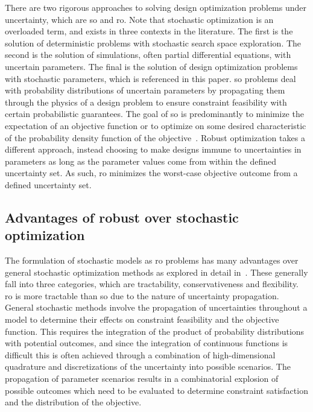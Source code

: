 There are two rigorous approaches to solving design optimization problems under uncertainty,
which are \gls{so} and \gls{ro}. Note that stochastic
optimization is an overloaded term, and exists in three contexts in the literature. The first is the solution
of deterministic problems with stochastic search space exploration. The second is the solution of simulations,
often partial differential equations, with uncertain parameters. The final is the solution
of design optimization problems with stochastic parameters, which is referenced in this paper.
\gls{so} problems
deal with probability distributions of
uncertain parameters by propagating them through the
physics of a design problem to ensure constraint feasibility with certain probabilistic guarantees.
The goal of \gls{so} is predominantly to minimize the expectation of an objective function or
to optimize on some desired characteristic of the probability density function of the objective~\cite{Diwekar2008}.
Robust optimization takes a different approach, instead choosing to make designs immune to
uncertainties in parameters as long as the parameter values come from within the defined
uncertainty set. As such, \gls{ro} minimizes the worst-case objective outcome from a defined uncertainty set.

\subsection{Advantages of robust over stochastic optimization}
\label{sec:robustvsstochastic}

The formulation of stochastic models as \gls{ro} problems has many advantages
over general stochastic optimization methods as explored in detail in~\cite{Bertsimas2011}.
These generally fall into three categories, which are tractability, conservativeness and flexibility.
\gls{ro} is more tractable than \gls{so} due to the nature of uncertainty propagation.
General stochastic methods involve the propagation of uncertainties throughout a model
to determine their effects on constraint feasibility and the objective function.
This requires the integration of the product of probability distributions with potential outcomes,
and since the integration of continuous functions is difficult this is often achieved through
a combination of high-dimensional quadrature and discretizations of the uncertainty into
possible scenarios. The propagation of parameter
scenarios results in a combinatorial explosion of possible outcomes which need to be evaluated to determine constraint
satisfaction and the distribution of the objective.

